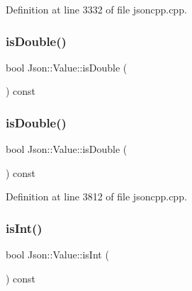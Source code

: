 Definition at line 3332 of file jsoncpp.\+cpp.

\hypertarget{class_json_1_1_value_a4a2e2a790e19a1c09fc5dd12d7ad47b5}{}\label{class_json_1_1_value_a4a2e2a790e19a1c09fc5dd12d7ad47b5} 
\subsubsection{\texorpdfstring{is\+Double()}{isDouble()}\hspace{0.1cm}{\footnotesize\ttfamily [1/2]}}
{\footnotesize\ttfamily bool Json\+::\+Value\+::is\+Double (\begin{DoxyParamCaption}{ }\end{DoxyParamCaption}) const}

\hypertarget{class_json_1_1_value_a4a2e2a790e19a1c09fc5dd12d7ad47b5}{}\label{class_json_1_1_value_a4a2e2a790e19a1c09fc5dd12d7ad47b5} 
\subsubsection{\texorpdfstring{is\+Double()}{isDouble()}\hspace{0.1cm}{\footnotesize\ttfamily [2/2]}}
{\footnotesize\ttfamily bool Json\+::\+Value\+::is\+Double (\begin{DoxyParamCaption}{ }\end{DoxyParamCaption}) const}



Definition at line 3812 of file jsoncpp.\+cpp.

\hypertarget{class_json_1_1_value_aff51d8b52979ca06cf9d909accd5f695}{}\label{class_json_1_1_value_aff51d8b52979ca06cf9d909accd5f695} 
\subsubsection{\texorpdfstring{is\+Int()}{isInt()}\hspace{0.1cm}{\footnotesize\ttfamily [1/2]}}
{\footnotesize\ttfamily bool Json\+::\+Value\+::is\+Int (\begin{DoxyParamCaption}{ }\end{DoxyParamCaption}) const}

